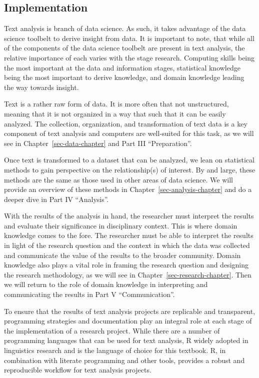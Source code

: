 \documentclass[
  letterpaper,
]{latex/krantz}
\theoremstyle{definition}
\theoremstyle{remark}
\begin{document}
\subsection{Implementation}\label{implementation}

Text analysis is branch of data science. As such, it takes advantage of
the data science toolbelt to derive insight from data. It is important
to note, that while all of the components of the data science toolbelt
are present in text analysis, the relative importance of each varies
with the stage research. Computing skills being the most important at
the data and information stages, statistical knowledge being the most
important to derive knowledge, and domain knowledge leading the way
towards insight.

Text is a rather raw form of data. It is more often that not
unstructured, meaning that it is not organized in a way that such that
it can be easily analyzed. The collection, organization, and
transformation of text data is a key component of text analysis and
computers are well-suited for this task, as we will see in
Chapter~\ref{sec-data-chapter} and Part III ``Preparation''.

Once text is transformed to a dataset that can be analyzed, we lean on
statistical methods to gain perspective on the relationship(s) of
interest. By and large, these methods are the same as those used in
other areas of data science. We will provide an overview of these
methods in Chapter~\ref{sec-analysis-chapter} and do a deeper dive in
Part IV ``Analysis''.

With the results of the analysis in hand, the researcher must interpret
the results and evaluate their significance in disciplinary context.
This is where domain knowledge comes to the fore. The researcher must be
able to interpret the results in light of the research question and the
context in which the data was collected and communicate the value of the
results to the broader community. Domain knowledge also plays a vital
role in framing the research question and designing the research
methodology, as we will see in Chapter~\ref{sec-research-chapter}. Then
we will return to the role of domain knowledge in interpreting and
communicating the results in Part V ``Communication''.

To ensure that the results of text analysis projects are replicable and
transparent, programming strategies and documentation play an integral
role at each stage of the implementation of a research project. While
there are a number of programming languages that can be used for text
analysis, R widely adopted in linguistics research and is the language
of choice for this textbook. R, in combination with literate programming
and other tools, provides a robust and reproducible workflow for text
analysis projects.
\end{document}
